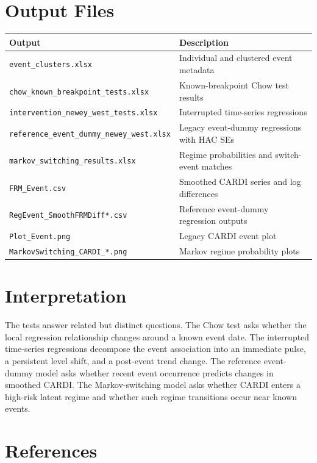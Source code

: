 \documentclass[11pt]{article}
\begin{document}
\section{Output Files}

\begin{longtable}{ll}
\toprule
Output & Description\\
\midrule
\texttt{event\_clusters.xlsx} & Individual and clustered event metadata\\
\texttt{chow\_known\_breakpoint\_tests.xlsx} & Known-breakpoint Chow test results\\
\texttt{intervention\_newey\_west\_tests.xlsx} & Interrupted time-series regressions\\
\texttt{reference\_event\_dummy\_newey\_west.xlsx} & Legacy event-dummy regressions with HAC SEs\\
\texttt{markov\_switching\_results.xlsx} & Regime probabilities and switch-event matches\\
\texttt{FRM\_Event.csv} & Smoothed CARDI series and log differences\\
\texttt{RegEvent\_SmoothFRMDiff*.csv} & Reference event-dummy regression outputs\\
\texttt{Plot\_Event.png} & Legacy CARDI event plot\\
\texttt{MarkovSwitching\_CARDI\_*.png} & Markov regime probability plots\\
\bottomrule
\end{longtable}

\section{Interpretation}

The tests answer related but distinct questions. The Chow test asks whether the
local regression relationship changes around a known event date. The
interrupted time-series regressions decompose the event association into an
immediate pulse, a persistent level shift, and a post-event trend change. The
reference event-dummy model asks whether recent event occurrence predicts
changes in smoothed CARDI. The Markov-switching model asks whether CARDI enters
a high-risk latent regime and whether such regime transitions occur near known
events.

\section*{References}
\end{document}
